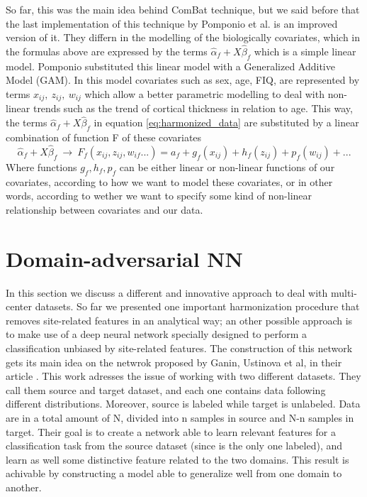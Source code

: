 \documentclass[11pt]{report}
\begin{document}
So far, this was the main idea behind ComBat technique, but we said before that the last implementation of this technique by Pomponio et al. \cite{pomponio-2019} is an improved version of it.
They differn in the modelling of the biologically covariates, which in the formulas above are expressed by the terms $\hat \alpha_f + X \hat \beta_f$ which is a simple linear model.
Pomponio substituted this linear model with a Generalized Additive Model (GAM). In this model covariates such as sex, age, FIQ, are represented by terms $x_{ij}, \ z_{ij}, \ w_{ij}$ which allow a better parametric modelling to deal with non-linear trends such as the trend of cortical thickness in relation to age.
This way, the terms $\hat \alpha_f + X \hat \beta_f$ in equation \ref{eq:harmonized_data} are substituted by a linear combination of function F of these covariates
\begin{equation}
\hat \alpha_f + X \hat \beta_f \ \longrightarrow \ F_f(x_{ij}, z_{ij}, w_{if}...) = a_f + g_f(x_{ij}) + h_f(z_{ij}) + p_f(w_{ij}) + ...
\end{equation}
Where functions $g_f, h_f, p_f$ can be either linear or non-linear functions of our covariates, according to how we want to model these covariates, or in other words, according to wether we want to specify some kind of non-linear relationship between covariates and our data.





\chapter{Domain-adversarial NN}\label{chap:domain_adversarial_theory}
In this section we discuss a different and innovative approach to deal with multi-center datasets.
So far we presented one important harmonization procedure that removes site-related features in an analytical way; an other possible approach is to make use of a deep neural network specially designed to perform a classification unbiased by site-related features.
The construction of this network gets its main idea on the netwrok proposed by Ganin, Ustinova et al, in their article \cite{ganin2016}.
This work adresses the issue of working with two different datasets. They call them source and target dataset, and each one contains data following different distributions. Moreover, source is labeled while target is unlabeled. Data are in a total amount of N, divided into n samples in source and N-n samples in target. Their goal is to create a network able to learn relevant features  for a classification task from the source dataset (since is the only one labeled), and learn as well some distinctive feature related to the two domains. This result is achivable by constructing a model able to generalize well from one domain to another.
\end{document}
